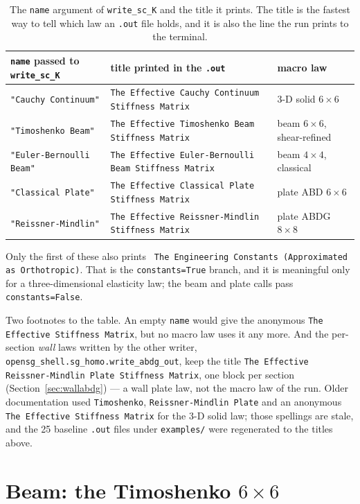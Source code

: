 \begin{table}[htbp]
\centering
\caption{The \texttt{name} argument of \texttt{write\_sc\_K} and the title it
prints. The title is the fastest way to tell which law an \texttt{.out} file
holds, and it is also the line the run prints to the terminal.}
\label{tab:outnames}
\scriptsize
\begin{tabular}{lll}
\toprule
\texttt{name} passed to \texttt{write\_sc\_K} & title printed in the \texttt{.out} & macro law \\
\midrule
\texttt{"Cauchy Continuum"} & \texttt{The Effective Cauchy Continuum Stiffness Matrix} & 3-D solid $6\times6$ \\
\texttt{"Timoshenko Beam"} & \texttt{The Effective Timoshenko Beam Stiffness Matrix} & beam $6\times6$, shear-refined \\
\texttt{"Euler-Bernoulli Beam"} & \texttt{The Effective Euler-Bernoulli Beam Stiffness Matrix} & beam $4\times4$, classical \\
\texttt{"Classical Plate"} & \texttt{The Effective Classical Plate Stiffness Matrix} & plate ABD $6\times6$ \\
\texttt{"Reissner-Mindlin"} & \texttt{The Effective Reissner-Mindlin Stiffness Matrix} & plate ABDG $8\times8$ \\
\bottomrule
\end{tabular}
\end{table}

Only the first of these also prints
\verb| The Engineering Constants (Approximated as Orthotropic)|. That is the
\texttt{constants=True} branch, and it is meaningful only for a
three-dimensional elasticity law; the beam and plate calls pass
\texttt{constants=False}.

Two footnotes to the table. An empty \texttt{name} would give the anonymous
\texttt{The Effective Stiffness Matrix}, but no macro law uses it any more.
And the per-section \emph{wall} laws written by the other writer,
\texttt{opensg\_shell.sg\_homo.write\_abdg\_out}, keep the title
\texttt{The Effective Reissner-Mindlin Plate Stiffness Matrix}, one block per
section (Section~\ref{sec:wallabdg}) --- a wall plate law, not the macro law of
the run. Older documentation used \texttt{Timoshenko},
\texttt{Reissner-Mindlin Plate} and an anonymous
\texttt{The Effective Stiffness Matrix} for the 3-D solid law; those spellings
are stale, and the 25 baseline \texttt{.out} files under \texttt{examples/}
were regenerated to the titles above.

\section{Beam: the Timoshenko $6\times6$}
\label{sec:timo}

